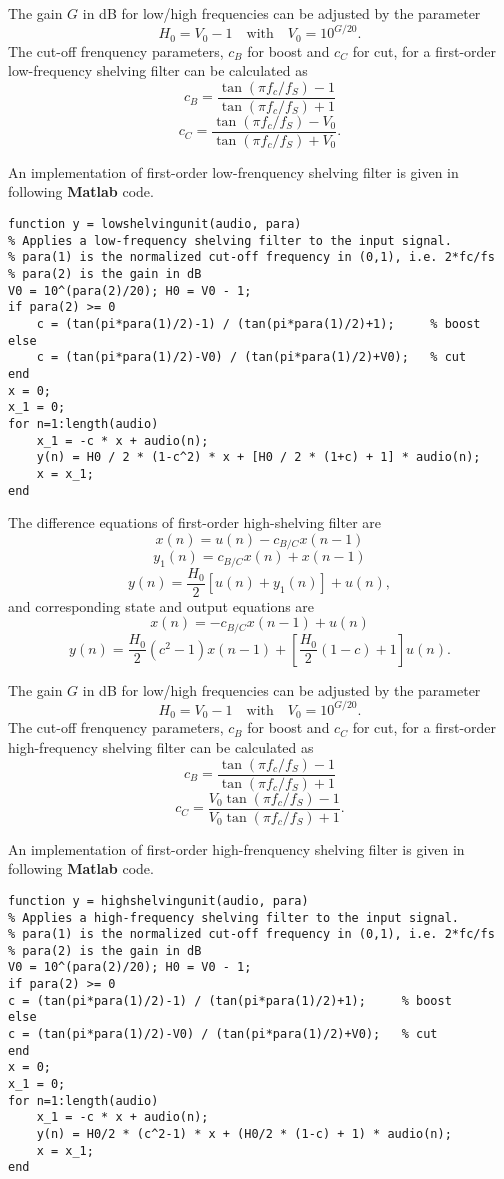\documentclass[10pt,a4paper,oneside]{article}
\begin{document}
The gain $G$ in dB for low/high frequencies can be adjusted by the parameter
\[
H_0 = V_0 - 1\quad \mbox{with} \quad V_0 = 10^{G/20}.
\]
The cut-off frenquency parameters, $c_B$ for boost and $c_C$ for cut, for a first-order low-frequency shelving filter can be calculated as
\[
c_B = \frac{\tan(\pi f_c/f_S) - 1}{\tan(\pi f_c/f_S) + 1}
\]
\[
c_C = \frac{\tan(\pi f_c/f_S) - V_0}{\tan(\pi f_c/f_S) + V_0}.
\]

An implementation of first-order low-frenquency shelving filter is given in following {\bfseries Matlab} code.
\begin{lstlisting}
function y = lowshelvingunit(audio, para)
% Applies a low-frequency shelving filter to the input signal.
% para(1) is the normalized cut-off frequency in (0,1), i.e. 2*fc/fs
% para(2) is the gain in dB
V0 = 10^(para(2)/20); H0 = V0 - 1;
if para(2) >= 0
	c = (tan(pi*para(1)/2)-1) / (tan(pi*para(1)/2)+1);     % boost
else
	c = (tan(pi*para(1)/2)-V0) / (tan(pi*para(1)/2)+V0);   % cut
end
x = 0;
x_1 = 0;
for n=1:length(audio)
	x_1 = -c * x + audio(n);
	y(n) = H0 / 2 * (1-c^2) * x + [H0 / 2 * (1+c) + 1] * audio(n);
	x = x_1;
end
\end{lstlisting}

The difference equations of first-order high-shelving filter are
\[
x(n) = u(n) - c_{B/C}x(n-1)
\]
\[
y_1(n) = c_{B/C}x(n) + x(n-1)
\]
\[
y(n) = \frac{H_0}{2}[u(n) + y_1(n)] + u(n),
\]
and corresponding state and output equations are
\[
x(n) = -c_{B/C}x(n-1) + u(n)
\]
\[
y(n) = \frac{H_0}{2}(c^2-1)x(n-1) + [\frac{H_0}{2}(1-c)+1]u(n).
\]

The gain $G$ in dB for low/high frequencies can be adjusted by the parameter
\[
H_0 = V_0 - 1\quad \mbox{with} \quad V_0 = 10^{G/20}.
\]
The cut-off frenquency parameters, $c_B$ for boost and $c_C$ for cut, for a first-order high-frequency shelving filter can be calculated as
\[
c_B = \frac{\tan(\pi f_c/f_S) - 1}{\tan(\pi f_c/f_S) + 1}
\]
\[
c_C = \frac{V_0\tan(\pi f_c/f_S) - 1}{V_0\tan(\pi f_c/f_S) + 1}.
\]

An implementation of first-order high-frenquency shelving filter is given in following {\bfseries Matlab} code.
\begin{lstlisting}
function y = highshelvingunit(audio, para)
% Applies a high-frequency shelving filter to the input signal.
% para(1) is the normalized cut-off frequency in (0,1), i.e. 2*fc/fs
% para(2) is the gain in dB
V0 = 10^(para(2)/20); H0 = V0 - 1;
if para(2) >= 0
c = (tan(pi*para(1)/2)-1) / (tan(pi*para(1)/2)+1);     % boost
else
c = (tan(pi*para(1)/2)-V0) / (tan(pi*para(1)/2)+V0);   % cut
end
x = 0;
x_1 = 0;
for n=1:length(audio)
	x_1 = -c * x + audio(n);
	y(n) = H0/2 * (c^2-1) * x + (H0/2 * (1-c) + 1) * audio(n);
	x = x_1;
end
\end{lstlisting}
\end{document}
